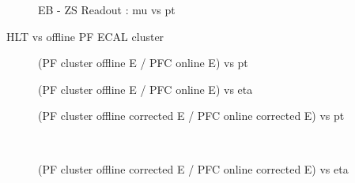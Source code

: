 \begin{figure}[ht]
\caption{EB - ZS Readout : mu vs pt}
\end{figure}

HLT vs offline PF ECAL cluster

\begin{figure}[ht]
\caption{(PF cluster offline E / PFC online E) vs pt}
\end{figure}

\begin{figure}[ht]
\caption{(PF cluster offline E / PFC online E) vs eta}
\end{figure}
\begin{figure}[ht]
\caption{(PF cluster offline corrected E / PFC online corrected E) vs pt}
\end{figure}~

\begin{figure}[ht]
\caption{(PF cluster offline corrected E / PFC online corrected E) vs eta}
\end{figure}~

